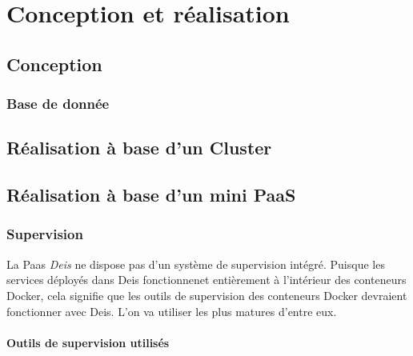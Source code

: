 \chapter{Conception et réalisation}
\begin{onehalfspace}

\newpage

\section{Conception}
\subsection{}
\subsection{Base de donnée}


\section{Réalisation à base d'un Cluster}


\section{Réalisation à base d'un mini PaaS}



\subsection{Supervision}

La Paas \emph{Deis} ne dispose pas d'un système de supervision intégré. Puisque les services déployés dans Deis fonctionnenet entièrement à l'intérieur des conteneurs Docker, cela signifie que les outils de supervision des conteneurs Docker devraient fonctionner avec Deis. L'on va utiliser les plus matures d'entre eux.


\subsubsection{Outils de supervision utilisés}






\end{onehalfspace}
